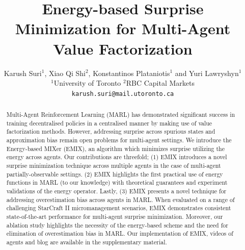 \documentclass{article}
\title{Energy-based Surprise Minimization for Multi-Agent Value Factorization}
\author{
  Karush Suri$^{1}$, Xiao Qi Shi$^{2}$, Konstantinos Plataniotis$^{1}$ and Yuri Lawryshyn$^{1}$\\
   $^{1}$University of Toronto $^{2}$RBC Capital Markets\\
  \texttt{karush.suri@mail.utoronto.ca}
}
\begin{document}
\maketitle

\begin{abstract}
 Multi-Agent Reinforcement Learning (MARL) has demonstrated significant success in training decentralised policies in a centralised manner by making use of value factorization methods. However, addressing surprise across spurious states and approximation bias remain open problems for multi-agent settings.  We introduce the Energy-based MIXer (EMIX), an algorithm which minimizes surprise utilizing the energy across agents. Our contributions are threefold; (1) EMIX introduces a novel surprise minimization technique across multiple agents in the case of multi-agent partially-observable settings. (2) EMIX highlights the first practical use of energy functions in MARL (to our knowledge) with theoretical guarantees and experiment validations of the energy operator. Lastly, (3) EMIX presents a novel technique for addressing overestimation bias across agents in MARL. When evaluated on a range of challenging StarCraft II micromanagement scenarios, EMIX demonstrates consistent state-of-the-art performance for multi-agent surprise minimization. Moreover, our ablation study highlights the necessity of the energy-based scheme and the need for elimination of overestimation bias in MARL. Our implementation of EMIX, videos of agents and blog are available in the supplementary material. 
\end{abstract}
\end{document}
